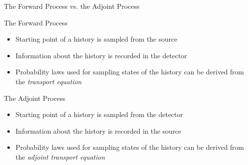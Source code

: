 \documentclass{beamer}
\begin{document}
\begin{frame}{The Forward Process vs. the Adjoint Process}

  \medskip

  \begin{beamerboxesrounded}[upper=boxheadcolor,lower=boxbodycolor,shadow=true]{The Forward Process}
    \begin{itemize}
      \item Starting point of a history is sampled from the source
      \item Information about the history is recorded in the detector
      \item Probability laws used for sampling states of the history
        can be derived from the \textit{transport equation}
    \end{itemize}
  \end{beamerboxesrounded}

  \bigskip
  \medskip

  \begin{beamerboxesrounded}[upper=boxheadcolor,lower=boxbodycolor,shadow=true]{The Adjoint Process}
    \begin{itemize}
      \item Starting point of a history is sampled from the detector
      \item Information about the history is recorded in the source
      \item Probability laws used for sampling states of the history
        can be derived from the \textit{adjoint transport equation}
    \end{itemize}
  \end{beamerboxesrounded}

\end{frame}

\end{document}

